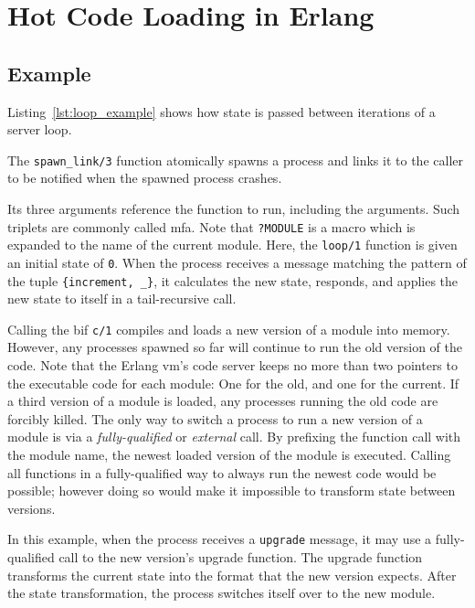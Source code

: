 \chapter{Hot Code Loading in Erlang}

\section{Example}



Listing~\ref{lst:loop_example} shows how state is passed between iterations of a server loop.

The \lstinline{spawn_link/3} function atomically spawns a process and links it to the caller to be notified when the spawned process crashes.

Its three arguments reference the function to run, including the arguments. Such triplets are commonly called \acrfull{mfa}. Note that \lstinline|?MODULE| is a macro which is expanded to the name of the current module. Here, the \lstinline{loop/1} function is given an initial state of \lstinline{0}. When the process receives a message matching the pattern of the tuple \lstinline|{increment, _}|, it calculates the new state, responds, and applies the new state to itself in a tail-recursive call.

Calling the \acrfull{bif} \lstinline|c/1| compiles and loads a new version of a module into memory.
However, any processes spawned so far will continue to run the old version of the code. Note that the Erlang \acrshort{vm}'s code server keeps no more than two pointers to the executable code for each module: One for the old, and one for the current. If a third version of a module is loaded, any processes running the old code are forcibly killed. The only way to switch a process to run a new version of a module is via a \emph{fully-qualified} or \emph{external} call. By prefixing the function call with the module name, the newest loaded version of the module is executed. Calling all functions in a fully-qualified way to always run the newest code would be possible; however doing so would make it impossible to transform state between versions.

In this example, when the process receives a \lstinline{upgrade} message, it may use a fully-qualified call to the new version's upgrade function. The upgrade function transforms the current state into the format that the new version expects. After the state transformation, the process switches itself over to the new module.




